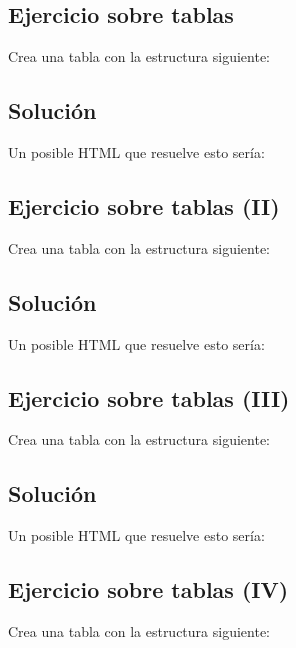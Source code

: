 \documentclass[letterpaper,10pt,spanish]{sphinxmanual}
\begin{document}
\subsection{Ejercicio sobre tablas}
\label{tema2:ejercicio-sobre-tablas}
Crea una tabla con la estructura siguiente:



\subsection{Solución}
\label{tema2:solucion}
Un posible HTML que resuelve esto sería:


\subsection{Ejercicio sobre tablas (II)}
\label{tema2:ejercicio-sobre-tablas-ii}
Crea una tabla con la estructura siguiente:



\subsection{Solución}
\label{tema2:id1}
Un posible HTML que resuelve esto sería:


\subsection{Ejercicio sobre tablas (III)}
\label{tema2:ejercicio-sobre-tablas-iii}
Crea una tabla con la estructura siguiente:



\subsection{Solución}
\label{tema2:id2}
Un posible HTML que resuelve esto sería:


\subsection{Ejercicio sobre tablas (IV)}
\label{tema2:ejercicio-sobre-tablas-iv}
Crea una tabla con la estructura siguiente:
\end{document}

